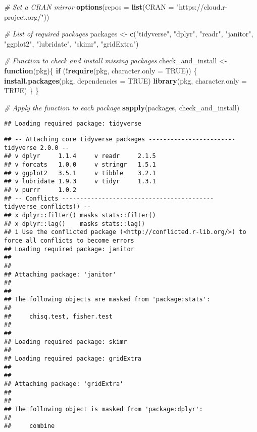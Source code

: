 \documentclass[
]{article}
\newenvironment{Shaded}{\begin{snugshade}}{\end{snugshade}}
\newcommand{\AttributeTok}[1]{\textcolor[rgb]{0.13,0.29,0.53}{#1}}
\newcommand{\CommentTok}[1]{\textcolor[rgb]{0.56,0.35,0.01}{\textit{#1}}}
\newcommand{\ConstantTok}[1]{\textcolor[rgb]{0.56,0.35,0.01}{#1}}
\newcommand{\ControlFlowTok}[1]{\textcolor[rgb]{0.13,0.29,0.53}{\textbf{#1}}}
\newcommand{\FunctionTok}[1]{\textcolor[rgb]{0.13,0.29,0.53}{\textbf{#1}}}
\newcommand{\NormalTok}[1]{#1}
\newcommand{\OtherTok}[1]{\textcolor[rgb]{0.56,0.35,0.01}{#1}}
\newcommand{\SpecialCharTok}[1]{\textcolor[rgb]{0.81,0.36,0.00}{\textbf{#1}}}
\newcommand{\StringTok}[1]{\textcolor[rgb]{0.31,0.60,0.02}{#1}}
\begin{document}
\begin{Shaded}
\begin{Highlighting}[]
\CommentTok{\# Set a CRAN mirror}
\FunctionTok{options}\NormalTok{(}\AttributeTok{repos =} \FunctionTok{list}\NormalTok{(}\AttributeTok{CRAN =} \StringTok{"https://cloud.r{-}project.org/"}\NormalTok{))}

\CommentTok{\# List of required packages}
\NormalTok{packages }\OtherTok{\textless{}{-}} \FunctionTok{c}\NormalTok{(}\StringTok{"tidyverse"}\NormalTok{, }\StringTok{"dplyr"}\NormalTok{, }\StringTok{"readr"}\NormalTok{, }\StringTok{"janitor"}\NormalTok{, }\StringTok{"ggplot2"}\NormalTok{, }\StringTok{"lubridate"}\NormalTok{, }\StringTok{"skimr"}\NormalTok{, }\StringTok{"gridExtra"}\NormalTok{)}

\CommentTok{\# Function to check and install missing packages}
\NormalTok{check\_and\_install }\OtherTok{\textless{}{-}} \ControlFlowTok{function}\NormalTok{(pkg)\{}
  \ControlFlowTok{if}\NormalTok{ (}\SpecialCharTok{!}\FunctionTok{require}\NormalTok{(pkg, }\AttributeTok{character.only =} \ConstantTok{TRUE}\NormalTok{)) \{}
    \FunctionTok{install.packages}\NormalTok{(pkg, }\AttributeTok{dependencies =} \ConstantTok{TRUE}\NormalTok{)}
    \FunctionTok{library}\NormalTok{(pkg, }\AttributeTok{character.only =} \ConstantTok{TRUE}\NormalTok{)}
\NormalTok{  \}}
\NormalTok{\}}

\CommentTok{\# Apply the function to each package}
\FunctionTok{sapply}\NormalTok{(packages, check\_and\_install)}
\end{Highlighting}
\end{Shaded}

\begin{verbatim}
## Loading required package: tidyverse
\end{verbatim}

\begin{verbatim}
## -- Attaching core tidyverse packages ------------------------ tidyverse 2.0.0 --
## v dplyr     1.1.4     v readr     2.1.5
## v forcats   1.0.0     v stringr   1.5.1
## v ggplot2   3.5.1     v tibble    3.2.1
## v lubridate 1.9.3     v tidyr     1.3.1
## v purrr     1.0.2     
## -- Conflicts ------------------------------------------ tidyverse_conflicts() --
## x dplyr::filter() masks stats::filter()
## x dplyr::lag()    masks stats::lag()
## i Use the conflicted package (<http://conflicted.r-lib.org/>) to force all conflicts to become errors
## Loading required package: janitor
## 
## 
## Attaching package: 'janitor'
## 
## 
## The following objects are masked from 'package:stats':
## 
##     chisq.test, fisher.test
## 
## 
## Loading required package: skimr
## 
## Loading required package: gridExtra
## 
## 
## Attaching package: 'gridExtra'
## 
## 
## The following object is masked from 'package:dplyr':
## 
##     combine
\end{verbatim}
\end{document}
